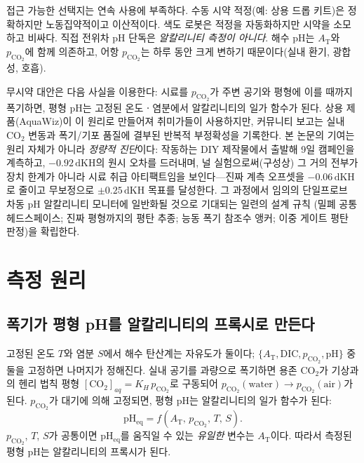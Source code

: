 \documentclass[11pt]{article}
\newcommand{\dkh}{\ensuremath{\,\mathrm{dKH}}}
\newcommand{\co}{\ensuremath{\mathrm{CO_2}}}
\newcommand{\pco}{\ensuremath{p_{\mathrm{CO_2}}}}
\newcommand{\at}{\ensuremath{A_\mathrm{T}}}
\begin{document}
접근 가능한 선택지는 연속 사용에 부족하다. 수동 시약 적정(예: 상용 드롭 키트)은
정확하지만 노동집약적이고 이산적이다. 색도 로봇은 적정을 자동화하지만 시약을
소모하고 비싸다. 직접 전위차 pH 단독은 \emph{알칼리니티 측정이 아니다}. 해수 pH는
\at{}와 \pco{}에 함께 의존하고, 어항 \pco{}는 하루 동안 크게 변하기 때문이다(실내
환기, 광합성, 호흡).

무시약 대안은 다음 사실을 이용한다: 시료를 \pco{}가 주변 공기와 평형에 이를 때까지
폭기하면, 평형 pH는 고정된 온도ㆍ염분에서 알칼리니티의 일가 함수가 된다. 상용
제품(AquaWiz)이 이 원리로 만들어져 취미가들이 사용하지만, 커뮤니티 보고는 실내
\co{} 변동과 폭기/기포 품질에 결부된 반복적 부정확성을 기록한다. 본 논문의 기여는
원리 자체가 아니라 \emph{정량적 진단}이다: 작동하는 DIY 제작물에서 출발해 9일
캠페인을 계측하고, $-0.92\dkh$의 원시 오차를 드러내며, 널 실험으로써(구성상) 그
거의 전부가 장치 한계가 아니라 시료 취급 아티팩트임을 보인다---진짜 계측 오프셋을
$-0.06\dkh$로 줄이고 무보정으로 $\pm0.25\dkh$ 목표를 달성한다. 그 과정에서 임의의
단일프로브 차동 pH 알칼리니티 모니터에 일반화될 것으로 기대되는 일련의 설계 규칙
(밀폐 공통 헤드스페이스; 진짜 평형까지의 평탄 추종; 능동 폭기 참조수 앵커; 이중
게이트 평탄 판정)을 확립한다.

\section{측정 원리}\label{sec:principle}

\subsection{폭기가 평형 pH를 알칼리니티의 프록시로 만든다}
고정된 온도 $T$와 염분 $S$에서 해수 탄산계는 자유도가 둘이다;
$\{\at{}, \mathrm{DIC}, \pco{}, \mathrm{pH}\}$ 중 둘을 고정하면 나머지가 정해진다.
실내 공기를 과량으로 폭기하면 용존 \co{}가 기상과의 헨리 법칙 평형
$[\co{}]_{aq}=K_H\,\pco{}$로 구동되어 $\pco{}(\mathrm{water}) \to
\pco{}(\mathrm{air})$가 된다. \pco{}가 대기에 의해 고정되면, 평형 pH는
알칼리니티의 일가 함수가 된다:
\begin{equation}
\mathrm{pH_{eq}} = f(\at{},\,\pco{},\,T,\,S).
\label{eq:pheq}
\end{equation}
\pco{}, $T$, $S$가 공통이면 $\mathrm{pH_{eq}}$를 움직일 수 있는 \emph{유일한}
변수는 \at{}이다. 따라서 측정된 평형 pH는 알칼리니티의 프록시가 된다.
\end{document}
